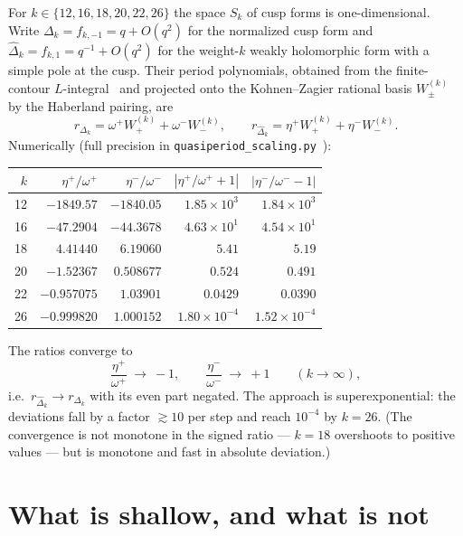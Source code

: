 \documentclass[11pt]{article}
\newcommand{\Dhat}{\widehat\Delta}
\begin{document}
For $k\in\{12,16,18,20,22,26\}$ the space $S_k$ of cusp forms is one-dimensional. Write
$\Delta_k=f_{k,-1}=q+O(q^2)$ for the normalized cusp form and $\Dhat_k=f_{k,1}=q^{-1}+O(q^2)$
for the weight-$k$ weakly holomorphic form with a simple pole at the cusp. Their period
polynomials, obtained from the finite-contour $L$-integral~\cite{FCC} and projected onto
the Kohnen--Zagier rational basis $W_\pm^{(k)}$~\cite{KZ1984} by the Haberland pairing, are
\begin{equation}\label{eq:decomp}
r_{\Delta_k}=\omega^+W_+^{(k)}+\omega^-W_-^{(k)},
\qquad
r_{\Dhat_k}=\eta^+W_+^{(k)}+\eta^-W_-^{(k)}.
\end{equation}
Numerically (full precision in \texttt{quasiperiod\_scaling.py}~\cite{VerifyScripts}):
\begin{center}
\begin{tabular}{r|rr|rr}
\toprule
$k$ & $\eta^+/\omega^+$ & $\eta^-/\omega^-$ & $|\eta^+/\omega^++1|$ & $|\eta^-/\omega^--1|$\\
\midrule
12 & $-1849.57$ & $-1840.05$ & $1.85\times10^{3}$ & $1.84\times10^{3}$\\
16 & $-47.2904$ & $-44.3678$ & $4.63\times10^{1}$ & $4.54\times10^{1}$\\
18 & $4.41440$  & $6.19060$  & $5.41$ & $5.19$\\
20 & $-1.52367$ & $0.508677$ & $0.524$ & $0.491$\\
22 & $-0.957075$& $1.03901$  & $0.0429$ & $0.0390$\\
26 & $-0.999820$& $1.000152$ & $1.80\times10^{-4}$ & $1.52\times10^{-4}$\\
\bottomrule
\end{tabular}
\end{center}
The ratios converge to
\begin{equation}\label{eq:scaling}
\frac{\eta^+}{\omega^+}\ \longrightarrow\ -1,
\qquad
\frac{\eta^-}{\omega^-}\ \longrightarrow\ +1
\qquad(k\to\infty),
\end{equation}
i.e.\ $r_{\Dhat_k}\to r_{\Delta_k}$ with its even part negated. The approach is
superexponential: the deviations fall by a factor $\gtrsim10$ per step and reach
$10^{-4}$ by $k=26$. (The convergence is not monotone in the signed ratio --- $k=18$
overshoots to positive values --- but is monotone and fast in absolute deviation.)

\section{What is shallow, and what is not}\label{sec:mech}
\end{document}

